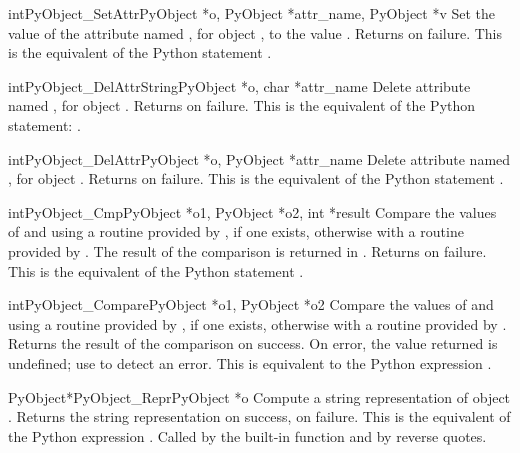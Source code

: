 \documentclass{manual}
\begin{document}
\begin{cfuncdesc}{int}{PyObject_SetAttr}{PyObject *o, PyObject *attr_name, PyObject *v}
Set the value of the attribute named , for
object ,
to the value . Returns  on failure.  This is
the equivalent of the Python statement .
\end{cfuncdesc}


\begin{cfuncdesc}{int}{PyObject_DelAttrString}{PyObject *o, char *attr_name}
Delete attribute named , for object . Returns
 on failure.  This is the equivalent of the Python
statement: .
\end{cfuncdesc}


\begin{cfuncdesc}{int}{PyObject_DelAttr}{PyObject *o, PyObject *attr_name}
Delete attribute named , for object . Returns
 on failure.  This is the equivalent of the Python
statement .
\end{cfuncdesc}


\begin{cfuncdesc}{int}{PyObject_Cmp}{PyObject *o1, PyObject *o2, int *result}
Compare the values of  and  using a routine provided
by , if one exists, otherwise with a routine provided by
.  The result of the comparison is returned in .
Returns  on failure.  This is the equivalent of the Python
statement .
\end{cfuncdesc}


\begin{cfuncdesc}{int}{PyObject_Compare}{PyObject *o1, PyObject *o2}
Compare the values of  and  using a routine provided
by , if one exists, otherwise with a routine provided by
.  Returns the result of the comparison on success.  On error,
the value returned is undefined; use  to
detect an error.  This is equivalent to the Python
expression .
\end{cfuncdesc}


\begin{cfuncdesc}{PyObject*}{PyObject_Repr}{PyObject *o}
Compute a string representation of object .  Returns the
string representation on success, \NULL{} on failure.  This is
the equivalent of the Python expression .
Called by the  built-in function
and by reverse quotes.
\end{cfuncdesc}
\end{document}
